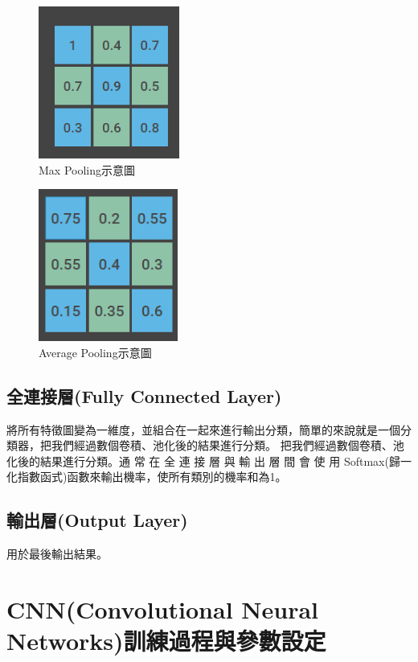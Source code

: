 \begin{figure}[H]
	\centerline{\includegraphics[height=5cm]{pic/poolinig 2.PNG}}
	\caption{Max Pooling示意圖}
	\label{fig:Max Pooling}
\end{figure}
\begin{figure}[H]
	\centerline{\includegraphics[height=5cm]{pic/pooling 3.PNG}}
	\caption{Average Pooling示意圖}
	\label{fig:Average Pooling}
\end{figure}


\subsection{全連接層(Fully Connected Layer)}
將所有特徵圖變為一維度，並組合在一起來進行輸出分類，簡單的來說就是一個分類器，把我們經過數個卷積、池化後的結果進行分類。
把我們經過數個卷積、池化後的結果進行分類。通 常 在 全 連 接 層 與 輸 出 層 間 會 使 用 Softmax(歸一化指數函式)函數來輸出機率，使所有類別的機率和為1。
\subsection{輸出層(Output Layer)}
用於最後輸出結果。


\section{CNN(Convolutional Neural Networks)訓練過程與參數設定}
